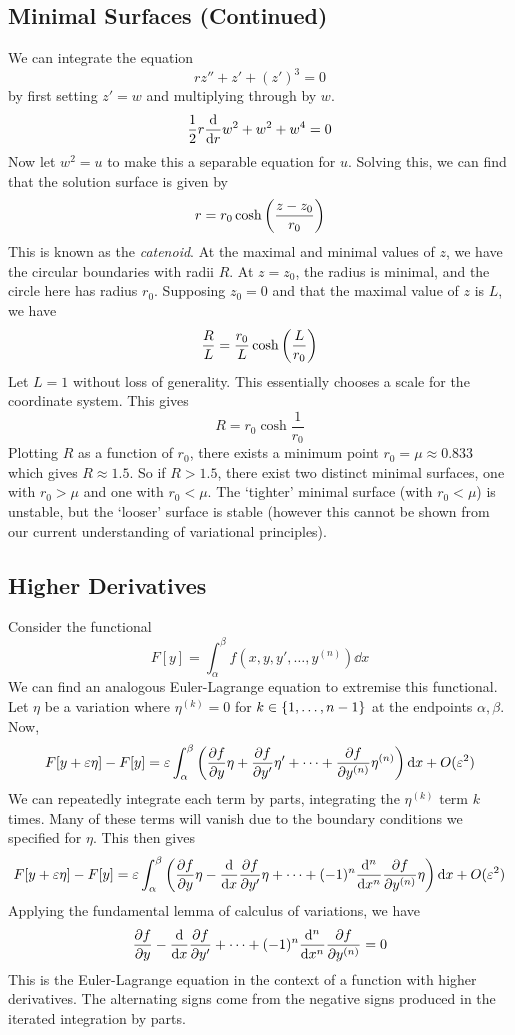 \subsection{Minimal Surfaces (Continued)}
We can integrate the equation
\[ rz'' + z' + (z')^3 = 0 \]
by first setting \( z' = w \) and multiplying through by \( w \).
\[ \frac{1}{2}r\dv{r} w^2 + w^2 + w^4 = 0 \]
Now let \( w^2 = u \) to make this a separable equation for \( u \).
Solving this, we can find that the solution surface is given by
\[ r = r_0 \cosh \qty(\frac{z-z_0}{r_0}) \]
This is known as the \textit{catenoid}.
At the maximal and minimal values of \( z \), we have the circular boundaries with radii \( R \).
At \( z = z_0 \), the radius is minimal, and the circle here has radius \( r_0 \).
Supposing \( z_0 = 0 \) and that the maximal value of \( z \) is \( L \), we have
\[ \frac{R}{L} = \frac{r_0}{L} \cosh \qty(\frac{L}{r_0}) \]
Let \( L = 1 \) without loss of generality. This essentially chooses a scale for the coordinate system. This gives
\[ R = r_0 \cosh \frac{1}{r_0} \]
Plotting \( R \) as a function of \( r_0 \), there exists a minimum point \( r_0 = \mu \approx 0.833 \) which gives \( R \approx 1.5 \).
So if \( R > 1.5 \), there exist two distinct minimal surfaces, one with \( r_0 > \mu \) and one with \( r_0 < \mu \).
The `tighter' minimal surface (with \( r_0 < \mu \)) is unstable, but the `looser' surface is stable (however this cannot be shown from our current understanding of variational principles).

\subsection{Higher Derivatives}
Consider the functional
\[ F[y] = \int_\alpha^\beta f(x,y,y',\dots,y^{(n)}) \dd{x} \]
We can find an analogous Euler-Lagrange equation to extremise this functional.
Let \( \eta \) be a variation where \( \eta^{(k)} = 0 \) for \( k \in \qty{1, \dots, n-1} \) at the endpoints \( \alpha, \beta \).
Now,
\[ F[y+\varepsilon \eta] - F[y] = \varepsilon\int_\alpha^\beta \qty(\pdv{f}{y} \eta + \pdv{f}{y'}\eta' + \dots + \pdv{f}{y^{(n)}}\eta^{(n)}) \dd{x} + O(\varepsilon^2) \]
We can repeatedly integrate each term by parts, integrating the \( \eta^{(k)} \) term \( k \) times.
Many of these terms will vanish due to the boundary conditions we specified for \( \eta \).
This then gives
\[ F[y+\varepsilon \eta] - F[y] = \varepsilon\int_\alpha^\beta \qty(\pdv{f}{y} \eta - \dv{x} \pdv{f}{y'}\eta + \dots + (-1)^n \dv[n]{x} \pdv{f}{y^{(n)}}\eta) \dd{x} + O(\varepsilon^2) \]
Applying the fundamental lemma of calculus of variations, we have
\[ \pdv{f}{y} - \dv{x} \pdv{f}{y'} + \dots + (-1)^n \dv[n]{x} \pdv{f}{y^{(n)}} = 0 \]
This is the Euler-Lagrange equation in the context of a function with higher derivatives.
The alternating signs come from the negative signs produced in the iterated integration by parts.

